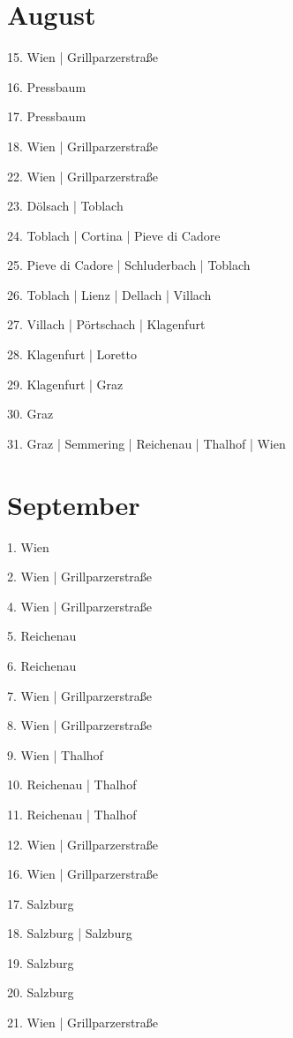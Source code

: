 \documentclass[twoside=false,titlepage=false,open=any, parskip=never, fontsize=10pt, headings=small, chapterprefix=false, appendixprefix=false, DIV=15]{scrbook}
\begin{document}
\begin{multicols}{3}
            \section*{August}
            15. Wien | Grillparzerstraße\par
            16. Pressbaum\par
            17. Pressbaum\par
            18. Wien | Grillparzerstraße\par
            22. Wien | Grillparzerstraße\par
            23. Dölsach | Toblach\par
            24. Toblach | Cortina | Pieve di Cadore\par
            25. Pieve di Cadore | Schluderbach | Toblach\par
            26. Toblach | Lienz | Dellach | Villach\par
            27. Villach | Pörtschach | Klagenfurt\par
            28. Klagenfurt | Loretto\par
            29. Klagenfurt | Graz\par
            30. Graz\par
            31. Graz | Semmering | Reichenau | Thalhof | Wien\par
            \section*{September}
            1. Wien\par
            2. Wien | Grillparzerstraße\par
            4. Wien | Grillparzerstraße\par
            5. Reichenau\par
            6. Reichenau\par
            7. Wien | Grillparzerstraße\par
            8. Wien | Grillparzerstraße\par
            9. Wien | Thalhof\par
            10. Reichenau | Thalhof\par
            11. Reichenau | Thalhof\par
            12. Wien | Grillparzerstraße\par
            16. Wien | Grillparzerstraße\par
            17. Salzburg\par
            18. Salzburg | Salzburg\par
            19. Salzburg\par
            20. Salzburg\par
            21. Wien | Grillparzerstraße\par

\end{multicols}
\end{document}
